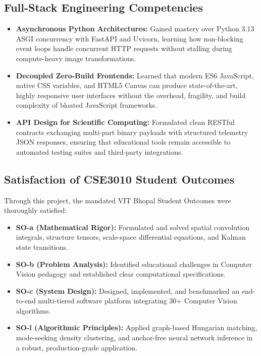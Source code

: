 \subsection{Full-Stack Engineering Competencies}
\begin{itemize}
    \item \textbf{Asynchronous Python Architectures:} Gained mastery over Python 3.13 ASGI concurrency with FastAPI and Uvicorn, learning how non-blocking event loops handle concurrent HTTP requests without stalling during compute-heavy image transformations.
    \item \textbf{Decoupled Zero-Build Frontends:} Learned that modern ES6 JavaScript, native CSS variables, and HTML5 Canvas can produce state-of-the-art, highly responsive user interfaces without the overhead, fragility, and build complexity of bloated JavaScript frameworks.
    \item \textbf{API Design for Scientific Computing:} Formulated clean RESTful contracts exchanging multi-part binary payloads with structured telemetry JSON responses, ensuring that educational tools remain accessible to automated testing suites and third-party integrations.
\end{itemize}

\subsection{Satisfaction of CSE3010 Student Outcomes}
Through this project, the mandated VIT Bhopal Student Outcomes were thoroughly satisfied:
\begin{itemize}
    \item \textbf{SO-a (Mathematical Rigor):} Formulated and solved spatial convolution integrals, structure tensors, scale-space differential equations, and Kalman state transitions.
    \item \textbf{SO-b (Problem Analysis):} Identified educational challenges in Computer Vision pedagogy and established clear computational specifications.
    \item \textbf{SO-c (System Design):} Designed, implemented, and benchmarked an end-to-end multi-tiered software platform integrating 30+ Computer Vision algorithms.
    \item \textbf{SO-l (Algorithmic Principles):} Applied graph-based Hungarian matching, mode-seeking density clustering, and anchor-free neural network inference in a robust, production-grade application.
\end{itemize}
